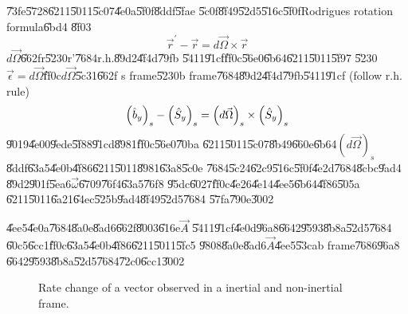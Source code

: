 \documentclass[12pt]{article}
\begin{document}
\U{73fe}\U{5728}\U{6211}\U{5011}\U{5c07}\U{4e0a}\U{5f0f}\U{8ddf}\U{5fae}%
\U{5c0f}\U{8f49}\U{52d5}\U{516c}\U{5f0f}Rodrigues rotation formula\U{6bd4}%
\U{8f03}%
\begin{equation*}
\vec{r}^{\prime }-\vec{r}=d\vec{\Omega}\times \vec{r}
\end{equation*}%
$d\vec{\Omega}$\U{662f}r\U{5230}r'\U{7684}r.h.\U{89d2}\U{4f4d}\U{79fb}%
\U{5411}\U{91cf}\thinspace \U{ff0c}\U{56e0}\U{6b64}\U{6211}\U{5011}\U{5f97}%
\U{5230}$\vec{\epsilon}=d\vec{\Omega}$\U{ff0c}$d\vec{\Omega}$\U{5c31}\U{662f}%
s frame\U{5230}b frame\U{7684}\U{89d2}\U{4f4d}\U{79fb}\U{5411}\U{91cf}%
(follow r.h. rule)%
\begin{equation*}
\left( \hat{b}_{y}\right) _{s}-\left( \hat{S}_{y}\right) _{s}=\left( d\vec{%
\Omega}\right) _{s}\times \left( \hat{S}_{y}\right) _{s}
\end{equation*}%
\U{9019}\U{4e00}\U{9ede}\U{5f88}\U{91cd}\U{8981}\U{ff0c}\U{56e0}\U{70ba}%
\U{6211}\U{5011}\U{5c07}\U{8b49}\U{660e}\U{6b64}$\left( d\vec{\Omega}\right)
_{s}$\U{8ddf}\U{63a5}\U{4e0b}\U{4f86}\U{6211}\U{5011}\U{8981}\U{63a8}\U{5c0e}%
\U{7684}\U{5c24}\U{62c9}\U{516c}\U{5f0f}\U{4e2d}\U{7684}\U{8cbc}\U{9ad4}%
\U{89d2}\U{901f}\U{5ea6}$\vec{\omega}$\U{6709}\U{76f4}\U{63a5}\U{76f8}%
\U{95dc}\U{6027}\U{ff0c}\U{4e26}\U{4e14}\U{4ee5}\U{6b64}\U{4f86}\U{505a}%
\U{6211}\U{5011}\U{6a21}\U{64ec}\U{525b}\U{9ad4}\U{8f49}\U{52d5}\U{7684}%
\U{57fa}\U{790e}\U{3002}

\bigskip

\U{4ee5}\U{4e0a}\U{7684}\U{8a0e}\U{8ad6}\U{662f}\U{8003}\U{616e}$\vec{A}$%
\U{5411}\U{91cf}\U{4e0d}\U{96a8}\U{6642}\U{9593}\U{8b8a}\U{52d5}\U{7684}%
\U{60c5}\U{6cc1}\U{ff0c}\U{63a5}\U{4e0b}\U{4f86}\U{6211}\U{5011}\U{5fc5}%
\U{9808}\U{8a0e}\U{8ad6}$\vec{A}$\U{4ee5}\U{53ca}b frame\U{7686}\U{96a8}%
\U{6642}\U{9593}\U{8b8a}\U{52d5}\U{7684}\U{72c0}\U{6cc1}\U{3002}

\bigskip 
\begin{figure}[th]
\caption{Rate change of a vector observed in a inertial and non-inertial
frame.}
\label{ratevecfig}
\begin{center}
\end{center}
\end{figure}
\end{document}
